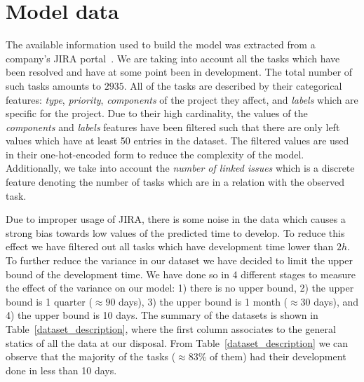 \documentclass[conference]{IEEEtran}
\begin{document}


\section{Model data}
The available information used to build the model was extracted from a company's JIRA portal~\cite{JIRA}. We are taking into account all the tasks which have been resolved and have at some point been in development. The total number of such tasks amounts to $2935$. All of the tasks are described by their categorical features: \textit{type}, \textit{priority}, \textit{components} of the project they affect, and \textit{labels} which are specific for the project. Due to their high cardinality, the values of the \textit{components} and \textit{labels} features have been filtered such that there are only left values which have at least 50 entries in the dataset. The filtered values are used in their one-hot-encoded form to reduce the complexity of the model. Additionally, we take into account the \textit{number of linked issues} which is a discrete feature denoting the number of tasks which are in a relation with the observed task.

Due to improper usage of JIRA, there is some noise in the data which causes a strong bias towards low values of the predicted time to develop. To reduce this effect we have filtered out all tasks which have development time lower than $2h$. To further reduce the variance in our dataset we have decided to limit the upper bound of the development time. We have done so in 4 different stages to measure the effect of the variance on our model: 1) there is no upper bound, 2) the upper bound is 1 quarter ($\approx 90$ days), 3) the upper bound is 1 month ($\approx 30$ days), and 4) the upper bound is 10 days. The summary of the datasets is shown in Table~\ref{dataset_description}, where the first column associates to the general statics of all the data at our disposal. From Table~\ref{dataset_description} we can observe that the majority of the tasks ($\approx 83\%$ of them) had their development done in less than 10 days.
\end{document}
